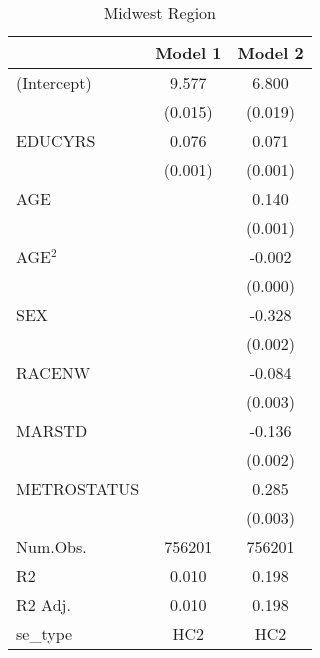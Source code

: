 \documentclass[12pt, English]{article}
\begin{document}
\begin{table}
\centering %
    \caption{Midwest Region}
    \vspace{7.5mm} %
\begin{tabular}[t]{lcc}
\toprule
  & Model 1 & Model 2\\
\midrule
(Intercept) & 9.577 & 6.800\\
 & (0.015) & (0.019)\\
EDUCYRS & 0.076 & 0.071\\
 & (0.001) & (0.001)\\
AGE &  & 0.140\\
 &  & (0.001)\\
AGE$^2$ &  & -0.002\\
 &  & (0.000)\\
SEX &  & -0.328\\
 &  & \vphantom{1} (0.002)\\
RACENW &  & -0.084\\
 &  & \vphantom{1} (0.003)\\
MARSTD &  & -0.136\\
 &  & (0.002)\\
METROSTATUS &  & 0.285\\
 &  & (0.003)\\
\midrule
Num.Obs. & 756201 & 756201\\
R2 & 0.010 & 0.198\\
R2 Adj. & 0.010 & 0.198\\
se\_type & HC2 & HC2\\
\bottomrule
\end{tabular}
\end{table}

\newpage
\end{document}

